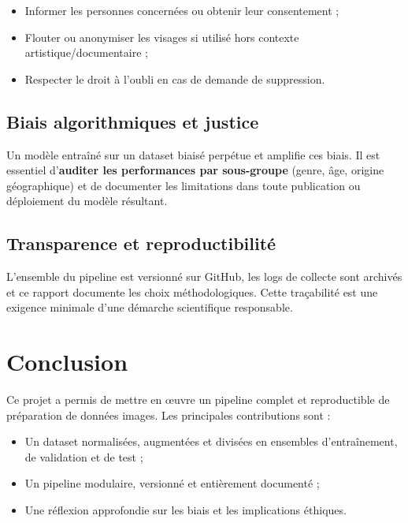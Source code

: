 \documentclass[12pt,a4paper]{article}
\begin{document}
\begin{itemize}[noitemsep]
  \item Informer les personnes concernées ou obtenir leur consentement ;
  \item Flouter ou anonymiser les visages si utilisé hors contexte artistique/documentaire ;
  \item Respecter le droit à l'oubli en cas de demande de suppression.
\end{itemize}

\subsection{Biais algorithmiques et justice}

Un modèle entraîné sur un dataset biaisé perpétue et amplifie ces biais. Il est
essentiel d'\textbf{auditer les performances par sous-groupe} (genre, âge,
origine géographique) et de documenter les limitations dans toute publication
ou déploiement du modèle résultant.

\subsection{Transparence et reproductibilité}

L'ensemble du pipeline est versionné sur GitHub, les logs de collecte sont archivés
et ce rapport documente les choix méthodologiques. Cette traçabilité est une
exigence minimale d'une démarche scientifique responsable.

\section{Conclusion}

Ce projet a permis de mettre en œuvre un pipeline complet et reproductible de
préparation de données images. Les principales contributions sont :

\begin{itemize}
  \item Un dataset normalisées, augmentées et divisées
        en ensembles d'entraînement, de validation et de test ;
  \item Un pipeline modulaire, versionné et entièrement documenté ;
  \item Une réflexion approfondie sur les biais et les implications éthiques.
\end{itemize}
\end{document}
